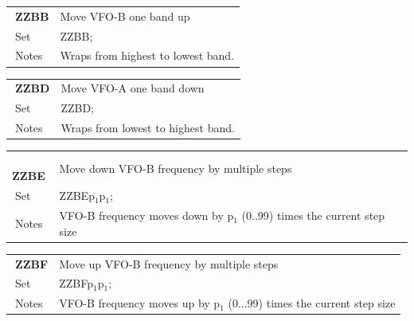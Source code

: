\documentclass[12pt]{book}
\begin{document}
\begin{center}
\begin{tabular}{|p{2cm}|p{11cm}|}
\toprule
$\phantom{\Big|}$\textbf{\large ZZBB} & Move VFO-B one band up \\\cline{1-2}
$\phantom{\Big|}${\large Set} & {ZZBB;} \\\hline
$\phantom{\Big|}${\large Notes} & \multicolumn{1}{|p{11cm}|}{Wraps from highest to lowest band.} \\
\bottomrule
\end{tabular}
\end{center}

\begin{center}
\begin{tabular}{|p{2cm}|p{11cm}|}
\toprule
$\phantom{\Big|}$\textbf{\large ZZBD} & Move VFO-A one band down \\\cline{1-2}
$\phantom{\Big|}${\large Set} & {ZZBD;} \\\hline
$\phantom{\Big|}${\large Notes} & \multicolumn{1}{|p{11cm}|}{Wraps from lowest to highest band.} \\
\bottomrule
\end{tabular}
\end{center}

\begin{center}
\begin{tabular}{|p{2cm}|p{11cm}|}
\toprule
$\phantom{\Big|}$\textbf{\large ZZBE} & Move down VFO-B frequency by multiple steps \\\cline{1-2}
$\phantom{\Big|}${\large Set} & {ZZBEp$_1$p$_1$;} \\\hline
$\phantom{\Big|}${\large Notes} & \multicolumn{1}{|p{11cm}|}{VFO-B frequency moves down by p$_1$ (0..99) times the current step size} \\
\bottomrule
\end{tabular}
\end{center}

\begin{center}
\begin{tabular}{|p{2cm}|p{11cm}|}
\toprule
$\phantom{\Big|}$\textbf{\large ZZBF} & Move up VFO-B frequency by multiple steps \\\cline{1-2}
$\phantom{\Big|}${\large Set} & {ZZBFp$_1$p$_1$;} \\\hline
$\phantom{\Big|}${\large Notes} & \multicolumn{1}{|p{11cm}|}{VFO-B frequency moves up by p$_1$ (0...99) times the current step size} \\
\bottomrule
\end{tabular}
\end{center}
\end{document}

